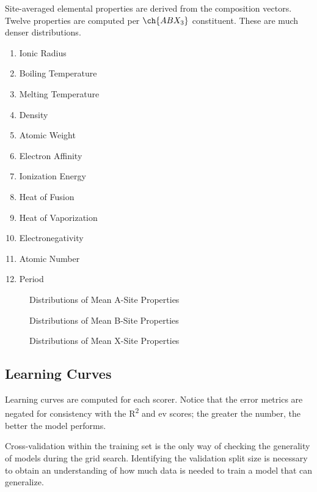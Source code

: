 \documentclass[aip, jmp, amsmath, amssymb, nofootinbib]{revtex4-2}
\begin{document}
Site-averaged elemental properties are derived from the composition
vectors. Twelve properties are computed per \(\ch{ABX_3}\)
constituent. These are much denser distributions.
\begin{enumerate}
\item Ionic Radius
\item Boiling Temperature
\item Melting Temperature
\item Density
\item Atomic Weight
\item Electron Affinity
\item Ionization Energy
\item Heat of Fusion
\item Heat of Vaporization
\item Electronegativity
\item Atomic Number
\item Period
\end{enumerate}

 
\begin{figure}[htbp]
\centering

\caption{Distributions of Mean A-Site Properties}
\end{figure}

 
\begin{figure}[htbp]
\centering

\caption{Distributions of Mean B-Site Properties}
\end{figure}

 
\begin{figure}[htbp]
\centering

\caption{Distributions of Mean X-Site Properties}
\end{figure}

\subsection*{Learning Curves}
\label{sec:org0db91ac}
Learning curves are computed for each scorer. Notice that the error
metrics are negated for consistency with the R\textsuperscript{2} and ev scores; the
greater the number, the better the model performs.

Cross-validation within the training set is the only way of checking
the generality of models during the grid search. Identifying the
validation split size is necessary to obtain an understanding of how
much data is needed to train a model that can generalize.
\end{document}
